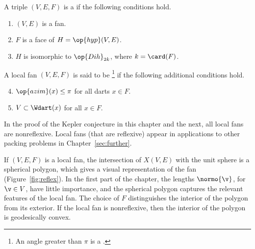 \begin{definition} \label{def:convex-local}
A triple $(V,E,F)$ is a  if the following conditions hold.
\begin{enumerate} 
\item {} $(V,E)$ is a fan.
\item {} $F$ is a face of $H = \op{hyp}(V,E)$.
\item {} $H$ is isomorphic to $\op{Dih}_{2k}$, where $k =
\card(F)$.
\end{enumerate}
A local fan $(V,E,F)$ is said to be \footnote{An angle
greater than $\pi$ is a .} if the following
additional conditions hold.
\begin{enumerate}
\setcounter{enumi}{3}
\item %
 $\op{azim}(x)\le \pi$ for all darts $x\in F$.
\item {} $V\subset \Wdart(x)$ for all $x\in F$.
\end{enumerate}
\end{definition}
%

In the proof of the Kepler conjecture in this chapter and the next,
all local fans are nonreflexive.  Local fans (that are reflexive) appear in
applications to other packing problems in Chapter~\ref{sec:further}.

\begin{remark}[visualization]\label{rem:visual}
\hspace{-3pt}
  If $(V,E,F)$ is a local fan,
  the intersection of $X(V,E)$ with the unit sphere is a spherical
  polygon, which gives a visual representation of the fan (Figure~\ref{fig:reflex}).
  In the first part of the chapter, the lengths $\normo{\v}$, for $\v\in V$,
  have little importance, and the spherical polygon captures the relevant
  features of the local fan.
  The choice of $F$ distinguishes the interior of the polygon from its
  exterior.  If the local fan is nonreflexive, then the interior of the
  polygon is geodesically convex.
\end{remark}

\figFWYNFVS %


